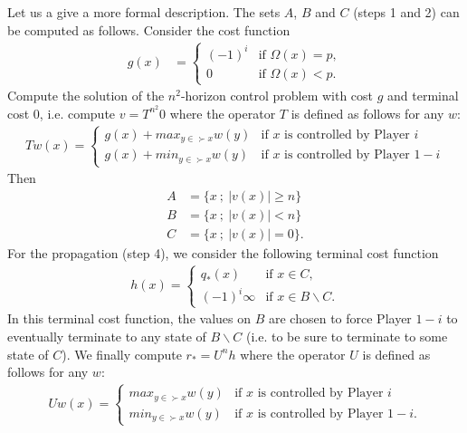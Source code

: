 \documentclass{article}
\begin{document}
Let us a give a more formal description. The sets $A$, $B$ and $C$ (steps 1 and 2) can be computed as follows. Consider the cost function
\begin{align}
  g(x) & = \left\{
  \begin{array}{ll}
    (-1)^i & \mbox{if }\Omega(x)=p, \\
    0 & \mbox{if }\Omega(x)<p.
  \end{array}
  \right.
\end{align}
Compute the solution of the $n^2$-horizon control problem with cost $g$ and terminal cost $0$, i.e. compute $v=T^{n^2}0$ where the operator $T$ is defined as follows for any $w$:
\begin{align}
  T w(x)= \left\{
  \begin{array}{ll}
    g(x) + max_{y \in \succ{x}} w(y)& \mbox{if $x$ is controlled by Player $i$} \\
    g(x) + min_{y \in \succ{x}} w(y)& \mbox{if $x$ is controlled by Player $1-i$}
  \end{array}
  \right.
\end{align}
Then
\begin{align}
  A & = \{ x ~;~ |v(x)| \ge n \} \\
  B & = \{ x ~;~ |v(x)| < n \} \\
  C & = \{ x ~;~ |v(x)| = 0 \}.
\end{align}
For the propagation (step 4), we consider the following terminal cost function
\begin{align}
  h(x) =  \left\{
  \begin{array}{ll}
    q_*(x) & \mbox{if }x \in C, \\
    (-1)^i \infty & \mbox{if }x \in B \backslash C.
  \end{array}
  \right.
\end{align}
In this terminal cost function, the values on $B$ are chosen to force Player $1-i$ to eventually terminate to any state of $B \backslash C$ (i.e. to be sure to terminate to some state of $C$).
We finally compute $r_* = U^n h$ where the operator $U$ is defined as follows for any $w$:
\begin{align}
  U w(x)= \left\{
  \begin{array}{ll}
    max_{y \in \succ{x}} w(y)& \mbox{if $x$ is controlled by Player $i$} \\
    min_{y \in \succ{x}} w(y)& \mbox{if $x$ is controlled by Player $1-i$}.
  \end{array}
  \right.
\end{align}


 
\end{document}
